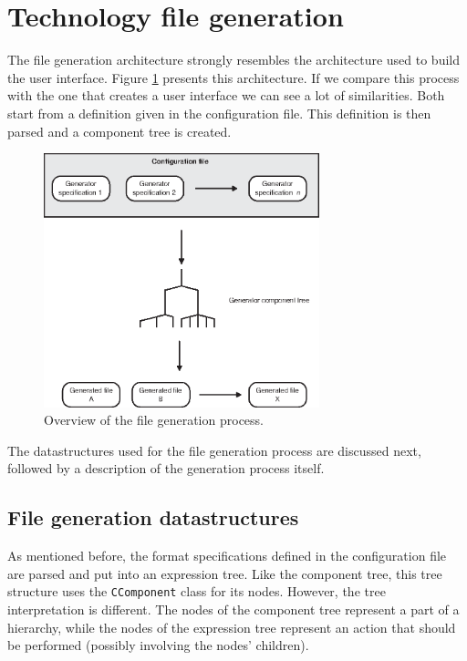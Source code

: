 \section{Technology file generation} \label{sect:design:filegeneration}
The file generation architecture strongly resembles the architecture used to
build the user interface. Figure \ref{fig:design:filegeneration} presents this
architecture. If we compare this process with the one that creates a user
interface we can see a lot of similarities. Both start from a definition given
in the configuration file. This definition is then parsed and a component tree
is created.

\begin{figure} \begin{center}
\includegraphics[width=8cm]{./figures/file_generation.eps}
\caption{Overview of the file generation process.}
\label{fig:design:filegeneration}
\end{center} \end{figure}

The datastructures used for the file generation process are discussed next,
followed by a description of the generation process itself.

\subsection{File generation datastructures}
As mentioned before, the format specifications defined in the configuration
file are parsed and put into an expression tree. Like the component tree, this
tree structure uses the \verb=CComponent= class for its nodes. However, the
tree interpretation is different. The nodes of the component tree represent a
part of a hierarchy, while the nodes of the expression tree represent an action
that should be performed (possibly involving the nodes' children).

